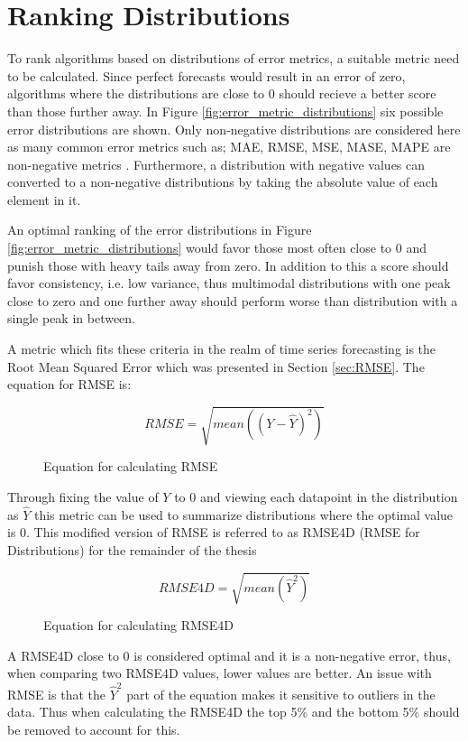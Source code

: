 \section{Ranking Distributions}
\label{sec:ranking_distributions}
To rank algorithms based on distributions of error metrics, a suitable metric need to be calculated. Since perfect forecasts would result in an error of zero, algorithms where the distributions are close to 0 should recieve a better score than those further away. In Figure \ref{fig:error_metric_distributions} six possible error distributions are shown. Only non-negative distributions are considered here as many common error metrics such as; MAE, RMSE, MSE, MASE, MAPE are non-negative metrics \cite{gluonts-github,hyndman_forecasting_3rd}. Furthermore, a distribution with negative values can converted to a non-negative distributions by taking the absolute value of each element in it.

An optimal ranking of the error distributions in Figure \ref{fig:error_metric_distributions} would favor those most often close to 0 and punish those with heavy tails away from zero. In addition to this a score should favor consistency, i.e. low variance, thus multimodal distributions with one peak close to zero and one further away should perform worse than distribution with a single peak in between.

A metric which fits these criteria in the realm of time series forecasting is the Root Mean Squared Error which was presented in Section \ref{sec:RMSE}. The equation for RMSE is:

\begin{figure}[h]
  \[RMSE = \sqrt{mean((Y - \hat{Y})^2)}\]
  \caption{Equation for calculating RMSE}
\end{figure}

Through fixing the value of \(Y\) to 0 and viewing each datapoint in the distribution as \(\hat{Y}\) this metric can be used to summarize distributions where the optimal value is 0. This modified version of RMSE is referred to as RMSE4D (RMSE for Distributions) for the remainder of the thesis

\begin{figure}[h]
  \[RMSE4D = \sqrt{mean(\hat{Y}^2)}\]
  \caption{Equation for calculating RMSE4D}
\end{figure}

A RMSE4D close to 0 is considered optimal and it is a non-negative error, thus, when comparing two RMSE4D values, lower values are better. An issue with RMSE is that the \(\hat{Y}^2\) part of the equation makes it sensitive to outliers in the data. Thus when calculating the RMSE4D the top 5\% and the bottom 5\% should be removed to account for this.


